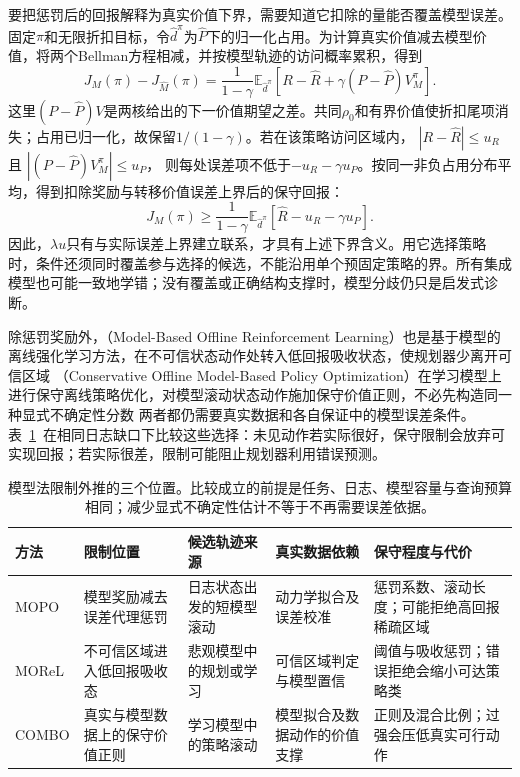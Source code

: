要把惩罚后的回报解释为真实价值下界，需要知道它扣除的量能否覆盖模型误差。固定$\pi$和无限折扣目标，令$\widehat d^\pi$为$\widehat P$下的归一化占用。为计算真实价值减去模型价值，将两个Bellman方程相减，并按模型轨迹的访问概率累积，得到
\begin{equation}
  \label{eq:rl-information-model-telescoping}
  J_M(\pi)-J_{\widehat M}(\pi)
  =\frac1{1-\gamma}\mathbb E_{\widehat d^\pi}
       \left[R-\widehat R
                  +\gamma(P-\widehat P)V_M^\pi\right].
\end{equation}
这里$(P-\widehat P)V$是两核给出的下一价值期望之差。共同$\rho_0$和有界价值使折扣尾项消失；占用已归一化，故保留$1/(1-\gamma)$。若在该策略访问区域内，
$|R-\widehat R|\leq u_R$且
$|(P-\widehat P)V_M^\pi|\leq u_P$，
则每处误差项不低于$-u_R-\gamma u_P$。按同一非负占用分布平均，得到扣除奖励与转移价值误差上界后的保守回报：
\[
  J_M(\pi)\geq
    \frac1{1-\gamma}\mathbb E_{\widehat d^\pi}
       [\widehat R-u_R-\gamma u_P].
\]
因此，$\lambda u$只有与实际误差上界建立联系，才具有上述下界含义。用它选择策略时，条件还须同时覆盖参与选择的候选，不能沿用单个预固定策略的界。所有集成模型也可能一致地学错；没有覆盖或正确结构支撑时，模型分歧仍只是启发式诊断。

除惩罚奖励外，（Model-Based Offline Reinforcement Learning）也是基于模型的离线强化学习方法，在不可信状态动作处转入低回报吸收状态，使规划器少离开可信区域
（Conservative Offline Model-Based Policy Optimization）在学习模型上进行保守离线策略优化，对模型滚动状态动作施加保守价值正则，不必先构造同一种显式不确定性分数
两者都仍需要真实数据和各自保证中的模型误差条件。表~\ref{tab:rl-information-model-methods}~在相同日志缺口下比较这些选择：未见动作若实际很好，保守限制会放弃可实现回报；若实际很差，限制可能阻止规划器利用错误预测。

\begin{table}[t]
  \centering
  \small
  \begin{tabularx}{\linewidth}{p{17mm}XXXX}
    \toprule
    方法 & 限制位置 & 候选轨迹来源 & 真实数据依赖 & 保守程度与代价 \\
    \midrule
    MOPO & 模型奖励减去误差代理惩罚 & 日志状态出发的短模型滚动 & 动力学拟合及误差校准 & 惩罚系数、滚动长度；可能拒绝高回报稀疏区域 \\
    MOReL & 不可信区域进入低回报吸收态 & 悲观模型中的规划或学习 & 可信区域判定与模型置信 & 阈值与吸收惩罚；错误拒绝会缩小可达策略类 \\
    COMBO & 真实与模型数据上的保守价值正则 & 学习模型中的策略滚动 & 模型拟合及数据动作的价值支撑 & 正则及混合比例；过强会压低真实可行动作 \\
    \bottomrule
  \end{tabularx}
  \caption{模型法限制外推的三个位置。比较成立的前提是任务、日志、模型容量与查询预算相同；减少显式不确定性估计不等于不再需要误差依据。}
  \label{tab:rl-information-model-methods}
\end{table}

